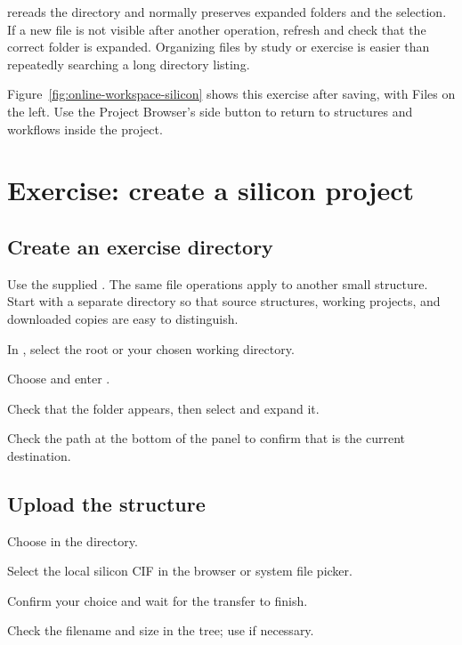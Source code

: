  rereads the directory and normally preserves expanded folders and the selection. If a new file is not visible after another operation, refresh and check that the correct folder is expanded. Organizing files by study or exercise is easier than repeatedly searching a long directory listing.

Figure~\ref{fig:online-workspace-silicon} shows this exercise after saving, with Files on the left. Use the Project Browser's side button to return to structures and workflows inside the project.

\section{Exercise: create a silicon project}

\subsection{Create an exercise directory}

Use the supplied . The same file operations apply to another small structure. Start with a separate directory so that source structures, working projects, and downloaded copies are easy to distinguish.

\begin{steps}
\item In , select the root or your chosen working directory.
\item Choose  and enter .
\item Check that the folder appears, then select and expand it.
\item Check the path at the bottom of the panel to confirm that  is the current destination.
\end{steps}

\subsection{Upload the structure}

\begin{steps}
\item Choose  in the  directory.
\item Select the local silicon CIF in the browser or system file picker.
\item Confirm your choice and wait for the transfer to finish.
\item Check the filename and size in the tree; use  if necessary.
\end{steps}

